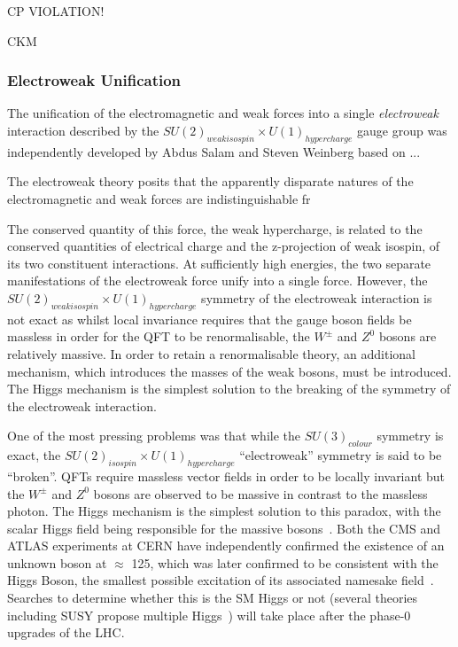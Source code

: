 CP VIOLATION!	

CKM

\subsubsection{Electroweak Unification}\label{subsec:electroweak}
The unification of the electromagnetic and weak forces into a single \emph{electroweak} interaction described by the $SU(2)_{weak isospin} \times U(1)_{hypercharge}$ gauge group was independently developed by Abdus Salam and Steven Weinberg based on ...

The electroweak theory posits that the apparently disparate natures of the electromagnetic and weak forces are indistinguishable fr

The conserved quantity of this force, the weak hypercharge, is related to the conserved quantities of electrical charge and the z-projection of weak isospin, of its two constituent interactions. 
At sufficiently high energies, the two separate manifestations of the electroweak force unify into a single force. 
However, the $SU(2)_{weak isospin} \times U(1)_{hypercharge}$ symmetry of the electroweak interaction is not exact as whilst local invariance requires that the gauge boson fields be massless in order for the QFT to be renormalisable, the $W^{\pm}$ and $Z^{0}$ bosons are relatively massive. 
In order to retain a renormalisable theory, an additional mechanism, which introduces the masses of the weak bosons, must be introduced. 
The Higgs mechanism is the simplest solution to the breaking of the symmetry of the electroweak interaction\cite{LagrangiansSM}. 

One of the most pressing problems was that while the $SU(3)_{colour}$ symmetry is exact, the $SU(2)_{isospin} \times U(1)_{hypercharge}$ ``electroweak'' symmetry is said to be ``broken''. 
QFTs require massless vector fields in order to be locally invariant but the $W^{\pm}$ and $Z^{0}$ bosons are observed to be massive in contrast to the massless photon. 
The Higgs mechanism is the simplest solution to this paradox, with the scalar Higgs field being responsible for the massive bosons~\cite{oldcms}. 
Both the CMS and ATLAS experiments at CERN have independently confirmed the existence of an unknown boson at $\approx$ 125\GeV, which was later confirmed to be consistent with the Higgs Boson, the smallest possible excitation of its associated namesake field~\cite{HiggsCMS,HiggsATLAS}. 
Searches to determine whether this is the SM Higgs or not (several theories including SUSY propose multiple Higgs~\cite{Khalil:2003vd,Gianotti:2002xx}) will take place after the phase-0 upgrades of the LHC. 

